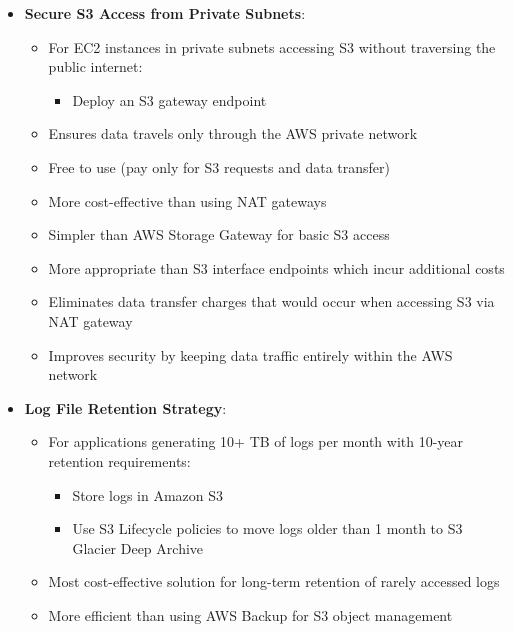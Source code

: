 \documentclass[11pt,a4paper]{report}
\begin{document}
\begin{itemize}
\begin{itemize}
  \item More robust than Lambda-based tracking solutions that introduce unnecessary complexity
  \item Directly addresses regulatory requirements for medical data retention and protection
  \item Meets requirements with minimal implementation effort compared to alternative approaches
\end{itemize}
  \item \textbf{Secure S3 Access from Private Subnets}:
\begin{itemize}
  \item For EC2 instances in private subnets accessing S3 without traversing the public internet:
\begin{itemize}
  \item Deploy an S3 gateway endpoint
\end{itemize}
  \item Ensures data travels only through the AWS private network
  \item Free to use (pay only for S3 requests and data transfer)
  \item More cost-effective than using NAT gateways
  \item Simpler than AWS Storage Gateway for basic S3 access
  \item More appropriate than S3 interface endpoints which incur additional costs
  \item Eliminates data transfer charges that would occur when accessing S3 via NAT gateway
  \item Improves security by keeping data traffic entirely within the AWS network
\end{itemize}
  \item \textbf{Log File Retention Strategy}:
\begin{itemize}
  \item For applications generating 10+ TB of logs per month with 10-year retention requirements:
\begin{itemize}
  \item Store logs in Amazon S3
  \item Use S3 Lifecycle policies to move logs older than 1 month to S3 Glacier Deep Archive
\end{itemize}
  \item Most cost-effective solution for long-term retention of rarely accessed logs
  \item More efficient than using AWS Backup for S3 object management

\end{itemize}
\end{itemize}
\end{document}
